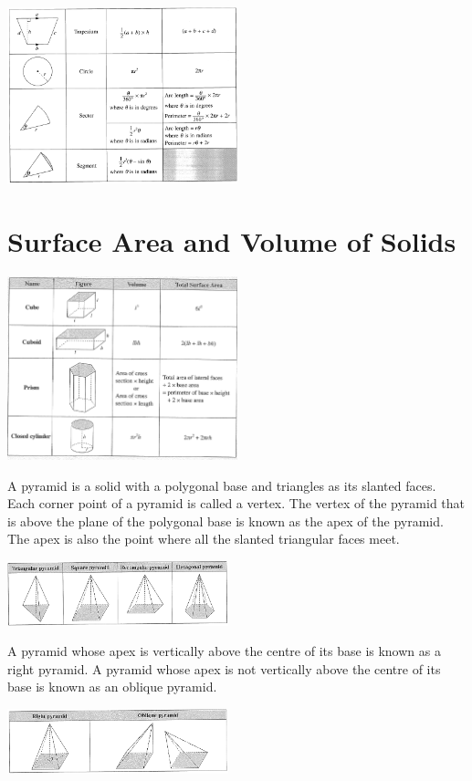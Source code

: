 \documentclass[twocolumn]{article}
\begin{document}
\includegraphics[width=0.5\textwidth]{81.png}

\section*{Surface Area and Volume of Solids}

\includegraphics[width=0.5\textwidth]{82.png}

\bigskip 

\noindent 
A pyramid is a solid with a polygonal base and triangles as its slanted faces. Each corner point of a pyramid is called a vertex. The vertex of the pyramid that is above the plane of the polygonal base is known as the apex of the pyramid. The apex is also the point where all the slanted triangular faces meet.

\includegraphics[width=0.48\textwidth]{85.png}

\bigskip 

\noindent 
A pyramid whose apex is vertically above the centre of its base is known as a right pyramid. A pyramid whose apex is not vertically above the centre of its base is known as an oblique pyramid. 

\includegraphics[width=0.48\textwidth]{86.png}
\end{document}
